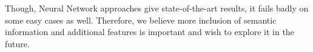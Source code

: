 \documentclass{IEEEtran}
\begin{document}
    Though, Neural Network approaches give state-of-the-art results, it fails badly on
    some easy cases as well. Therefore, we believe more inclusion of semantic information
    and additional features is important and wish to explore it in the future.

    
    
\end{document}
